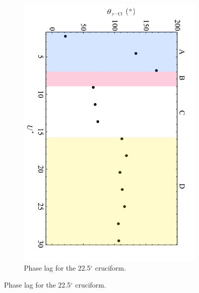 \documentclass[oneside]{utmthesis}
\begin{document}
\begin{figure}[H]
  \centering
  \begin{subfigure}[h]{0.9\textwidth}
    \includegraphics[angle=90,width=\textwidth]{figs/phaseLag2}
    \caption{Phase lag for the 22.5$^{\circ}$ cruciform.}
    \label{fig:phaseLag225deg}
  \end{subfigure}


\end{figure}
\end{document}
